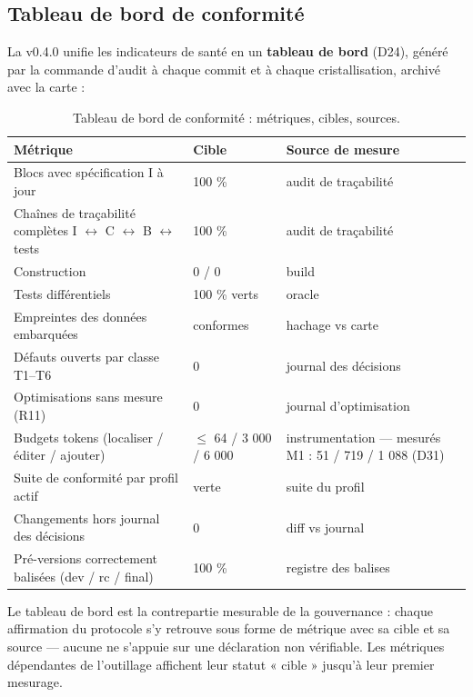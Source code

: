 \subsection{Tableau de bord de conformité}\label{sec:tableaudebord}

La v0.4.0 unifie les indicateurs de santé en un \textbf{tableau de bord} (D24), généré par
la commande d'audit à chaque commit et à chaque cristallisation, archivé avec la carte :

\begin{table}[htbp]
\centering\small
\caption{Tableau de bord de conformité : métriques, cibles, sources.}
\label{tab:dashboard}
\begin{tabularx}{\textwidth}{@{}Y l Y@{}}
\toprule
\textbf{Métrique} & \textbf{Cible} & \textbf{Source de mesure} \\
\midrule
Blocs avec spécification I à jour & 100 \% & audit de traçabilité \\
Chaînes de traçabilité complètes I $\leftrightarrow$ C $\leftrightarrow$ B
$\leftrightarrow$ tests & 100 \% & audit de traçabilité \\
Construction & 0 / 0 & build \\
Tests différentiels & 100 \% verts & oracle \\
Empreintes des données embarquées & conformes & hachage vs carte \\
Défauts ouverts par classe T1–T6 & 0 & journal des décisions \\
Optimisations sans mesure (R11) & 0 & journal d'optimisation \\
Budgets tokens (localiser / éditer / ajouter) & $\leq$ 64 / 3 000 / 6 000 &
instrumentation — mesurés M1 : 51 / 719 / 1 088 (D31) \\
Suite de conformité par profil actif & verte & suite du profil \\
Changements hors journal des décisions & 0 & diff vs journal \\
Pré-versions correctement balisées (dev / rc / final) & 100 \% & registre des balises \\
\bottomrule
\end{tabularx}
\end{table}

Le tableau de bord est la contrepartie mesurable de la gouvernance : chaque affirmation du
protocole s'y retrouve sous forme de métrique avec sa cible et sa source — aucune ne
s'appuie sur une déclaration non vérifiable. Les métriques dépendantes de l'outillage
affichent leur statut « cible » jusqu'à leur premier mesurage.

